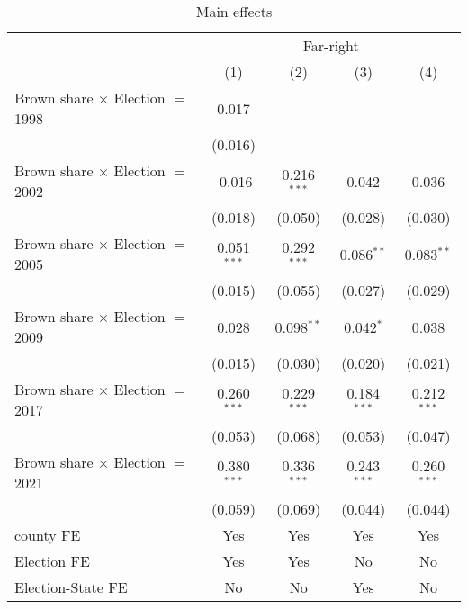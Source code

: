 \begin{table}[htbp]
   \caption{Main effects}
   \centering
   \begin{tabular}{lcccc}
      \tabularnewline \midrule \midrule
       & \multicolumn{4}{c}{Far-right}\\
                                              & (1)           & (2)           & (3)           & (4)\\  
      Brown share $\times$ Election $=$ 1998  & 0.017         &               &               &   \\   
                                              & (0.016)       &               &               &   \\   
      Brown share $\times$ Election $=$ 2002  & -0.016        & 0.216$^{***}$ & 0.042         & 0.036\\   
                                              & (0.018)       & (0.050)       & (0.028)       & (0.030)\\   
      Brown share $\times$ Election $=$ 2005  & 0.051$^{***}$ & 0.292$^{***}$ & 0.086$^{**}$  & 0.083$^{**}$\\   
                                              & (0.015)       & (0.055)       & (0.027)       & (0.029)\\   
      Brown share $\times$ Election $=$ 2009  & 0.028         & 0.098$^{**}$  & 0.042$^{*}$   & 0.038\\   
                                              & (0.015)       & (0.030)       & (0.020)       & (0.021)\\   
      Brown share $\times$ Election $=$ 2017  & 0.260$^{***}$ & 0.229$^{***}$ & 0.184$^{***}$ & 0.212$^{***}$\\   
                                              & (0.053)       & (0.068)       & (0.053)       & (0.047)\\   
      Brown share $\times$ Election $=$ 2021  & 0.380$^{***}$ & 0.336$^{***}$ & 0.243$^{***}$ & 0.260$^{***}$\\   
                                              & (0.059)       & (0.069)       & (0.044)       & (0.044)\\   
      county FE                               & Yes           & Yes           & Yes           & Yes\\  
      Election FE                             & Yes           & Yes           & No            & No\\  
      Election-State FE                       & No            & No            & Yes           & No\\  

\end{tabular}
\end{table}
